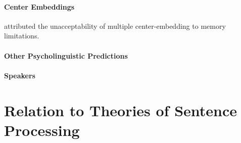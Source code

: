 \documentclass[11pt,letterpaper]{article}
\begin{document}
\paragraph{Center Embeddings}

\cite{miller-finitary-1963} attributed the unacceptability of multiple center-embedding to memory limitations.







\paragraph{Other Psycholinguistic Predictions}


\paragraph{Speakers}


\section{Relation to Theories of Sentence Processing}
\end{document}
